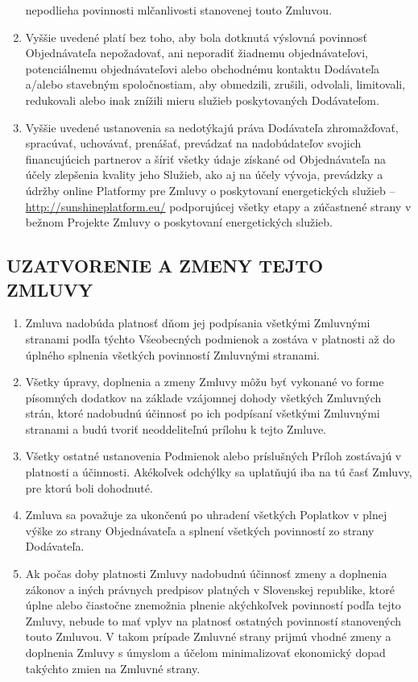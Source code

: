 \begin{multicols}{2}
\begin{enumerate}
  nepodlieha povinnosti mlčanlivosti stanovenej touto Zmluvou.
\item
  Vyššie uvedené platí bez toho, aby bola dotknutá výslovná povinnosť
  Objednávateľa nepožadovať, ani neporadiť žiadnemu objednávateľovi,
  potenciálnemu objednávateľovi alebo obchodnému kontaktu Dodávateľa
  a/alebo stavebným spoločnostiam, aby obmedzili, zrušili, odvolali,
  limitovali, redukovali alebo inak znížili mieru služieb poskytovaných
  Dodávateľom.
\item
  Vyššie uvedené ustanovenia sa nedotýkajú práva Dodávateľa
  zhromažďovať, spracúvať, uchovávať, prenášať, prevádzať na
  nadobúdateľov svojich financujúcich partnerov a šíriť všetky údaje
  získané od Objednávateľa na účely zlepšenia kvality jeho Služieb, ako
  aj na účely vývoja, prevádzky a údržby online Platformy pre Zmluvy o
  poskytovaní energetických služieb --
  \href{http://www.sharex.lv}{http://sunshineplatform.eu/} podporujúcej
  všetky etapy a zúčastnené strany v bežnom Projekte Zmluvy o
  poskytovaní energetických služieb.
\end{enumerate}

\subsection{UZATVORENIE A ZMENY TEJTO ZMLUVY}

\begin{enumerate}
\def\labelenumi{\arabic{enumi}.}
\item
  Zmluva nadobúda platnosť dňom jej podpísania všetkými Zmluvnými
  stranami podľa týchto Všeobecných podmienok a zostáva v platnosti až
  do úplného splnenia všetkých povinností Zmluvnými stranami.
\item
  Všetky úpravy, doplnenia a zmeny Zmluvy môžu byť vykonané vo forme
  písomných dodatkov na základe vzájomnej dohody všetkých Zmluvných
  strán, ktoré nadobudnú účinnosť po ich podpísaní všetkými Zmluvnými
  stranami a budú tvoriť neoddeliteľnú prílohu k tejto Zmluve.
\item
  Všetky ostatné ustanovenia Podmienok alebo príslušných Príloh
  zostávajú v platnosti a účinnosti. Akékoľvek odchýlky sa uplatňujú iba
  na tú časť Zmluvy, pre ktorú boli dohodnuté.
\item
  Zmluva sa považuje za ukončenú po uhradení všetkých Poplatkov v plnej
  výške zo strany Objednávateľa a splnení všetkých povinností zo strany
  Dodávateľa.
\item
  Ak počas doby platnosti Zmluvy nadobudnú účinnosť zmeny a doplnenia
  zákonov a iných právnych predpisov platných v Slovenskej republike,
  ktoré úplne alebo čiastočne znemožnia plnenie akýchkoľvek povinností
  podľa tejto Zmluvy, nebude to mať vplyv na platnosť ostatných
  povinností stanovených touto Zmluvou. V takom prípade Zmluvné strany
  prijmú vhodné zmeny a doplnenia Zmluvy s úmyslom a účelom
  minimalizovať ekonomický dopad takýchto zmien na Zmluvné strany.
\end{enumerate}


\end{multicols}
